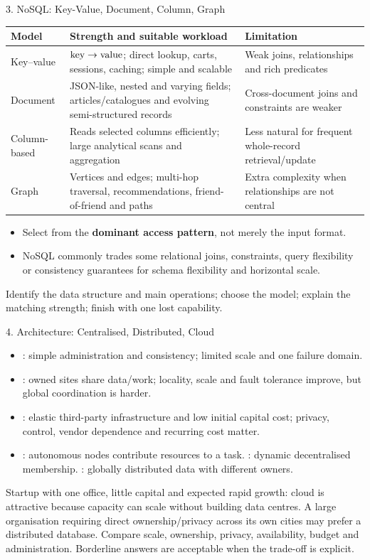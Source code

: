 \begin{topic}{3. NoSQL: Key-Value, Document, Column, Graph}
\begin{tabularx}{\linewidth}{@{}lYY@{}}
\toprule
Model & Strength and suitable workload & Limitation\\
\midrule
Key--value & \(\text{key}\rightarrow\text{value}\); direct lookup, carts, sessions, caching; simple and scalable & Weak joins, relationships and rich predicates\\
Document & JSON-like, nested and varying fields; articles/catalogues and evolving semi-structured records & Cross-document joins and constraints are weaker\\
Column-based & Reads selected columns efficiently; large analytical scans and aggregation & Less natural for frequent whole-record retrieval/update\\
Graph & Vertices and edges; multi-hop traversal, recommendations, friend-of-friend and paths & Extra complexity when relationships are not central\\
\bottomrule
\end{tabularx}
\begin{itemize}
  \item Select from the \textbf{dominant access pattern}, not merely the input format.
  \item NoSQL commonly trades some relational joins, constraints, query flexibility or consistency guarantees for schema flexibility and horizontal scale.
\end{itemize}
\answer Identify the data structure and main operations; choose the model; explain the matching strength; finish with one lost capability.
\end{topic}

\begin{topic}{4. Architecture: Centralised, Distributed, Cloud}
\begin{itemize}
  \item {}: simple administration and consistency; limited scale and one failure domain.
  \item {}: owned sites share data/work; locality, scale and fault tolerance improve, but global coordination is harder.
  \item {}: elastic third-party infrastructure and low initial capital cost; privacy, control, vendor dependence and recurring cost matter.
  \item {}: autonomous nodes contribute resources to a task. : dynamic decentralised membership. : globally distributed data with different owners.
\end{itemize}
\worked Startup with one office, little capital and expected rapid growth: cloud is attractive because capacity can scale without building data centres. A large organisation requiring direct ownership/privacy across its own cities may prefer a distributed database.
\answer Compare scale, ownership, privacy, availability, budget and administration. Borderline answers are acceptable when the trade-off is explicit.
\end{topic}

